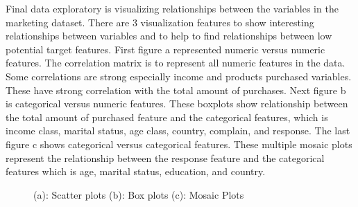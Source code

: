 \documentclass[11pt]{article} %
\begin{document}
\quad Final data exploratory is visualizing relationships between the variables in the marketing dataset. There are 3 visualization features to show interesting relationships between variables and to help to find relationships between low potential target features. First figure a represented numeric versus numeric features. The correlation matrix is to represent all numeric features in the data. Some correlations are strong especially income and products purchased variables. These have strong correlation with the total amount of purchases. Next figure b is categorical versus numeric features. These boxplots show relationship between the total amount of purchased feature and the categorical features, which is income class, marital status, age class, country, complain, and response. The last figure c shows categorical versus categorical features. These multiple mosaic plots represent the relationship between the response feature and the categorical features which is age, marital status, education, and country. 
\begin{figure}
    \centering
    \caption{(a): Scatter plots (b): Box plots (c): Mosaic Plots}
    \label{fig:foobar}
\end{figure}
\newpage
\end{document}
